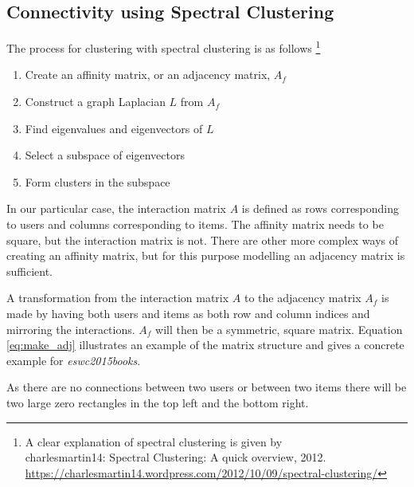 
\subsection{Connectivity using Spectral Clustering}

The process for clustering with spectral clustering is as follows
\footnote{A clear explanation of spectral clustering is given by \\
charlesmartin14: Spectral Clustering: A quick overview, 2012. \\
\url{https://charlesmartin14.wordpress.com/2012/10/09/spectral-clustering/}}

\begin{enumerate}
    \item Create an affinity matrix, or an adjacency matrix, $A_f$
    \item Construct a graph Laplacian $L$ from $A_f$
    \item Find eigenvalues and eigenvectors of $L$
    \item Select a subspace of eigenvectors
    \item Form clusters in the subspace
\end{enumerate}

In our particular case, the interaction matrix $A$ is defined as rows corresponding to users and columns corresponding to items. The affinity matrix needs to be square, but the interaction matrix is not. There are other more complex ways of creating an affinity matrix, but for this purpose modelling an adjacency matrix is sufficient.

A transformation from the interaction matrix $A$ to the adjacency matrix $A_{f}$ is made by having both users and items as both row and column indices and mirroring the interactions. $A_{f}$ will then be a symmetric, square matrix. Equation \eqref{eq:make_adj} illustrates an example of the matrix structure and  gives a concrete example for \textit{eswc2015books}.

As there are no connections between two users or between two items there will be two large zero rectangles in the top left and the bottom right.

